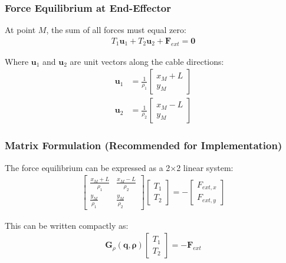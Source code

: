 \subsubsection{Force Equilibrium at End-Effector}

At point $M$, the sum of all forces must equal zero:
\begin{align}
T_1 \bm{u}_1 + T_2 \bm{u}_2 + \bm{F}_{ext} = \bm{0}
\end{align}

Where $\bm{u}_1$ and $\bm{u}_2$ are unit vectors along the cable directions:
\begin{align}
\bm{u}_1 &= \frac{1}{\rho_1} \begin{bmatrix} x_M + L \\ y_M \end{bmatrix} \\
\bm{u}_2 &= \frac{1}{\rho_2} \begin{bmatrix} x_M - L \\ y_M \end{bmatrix}
\end{align}

\subsubsection{Matrix Formulation (Recommended for Implementation)}

The force equilibrium can be expressed as a 2×2 linear system:
\begin{align}
\begin{bmatrix}
\frac{x_M + L}{\rho_1} & \frac{x_M - L}{\rho_2} \\
\frac{y_M}{\rho_1} & \frac{y_M}{\rho_2}
\end{bmatrix} \begin{bmatrix} T_1 \\ T_2 \end{bmatrix} = -\begin{bmatrix} F_{ext,x} \\ F_{ext,y} \end{bmatrix}
\end{align}

This can be written compactly as:
\begin{align}
\bm{G}_{\rho}(\bm{q}, \bm{\rho}) \begin{bmatrix} T_1 \\ T_2 \end{bmatrix} = -\bm{F}_{ext}
\end{align}

